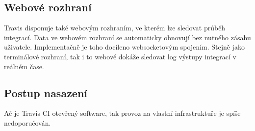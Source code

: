 \subsection{Webové rozhraní}

Travis disponuje také webovým rozhraním, ve kterém lze sledovat průběh integrací.
Data ve webovém rozhraní se automaticky obnovují bez nutného zásahu uživatele.
Implementačně je toho docíleno websocketovým spojením.
Stejně jako terminálové rozhraní, tak i to webové dokáže sledovat log výstupy integrací v reálném čase.

\subsection{Postup nasazení}

Ač je Travis CI otevřený software, tak provoz na vlastní infrastruktuře je spíše nedoporučován.
